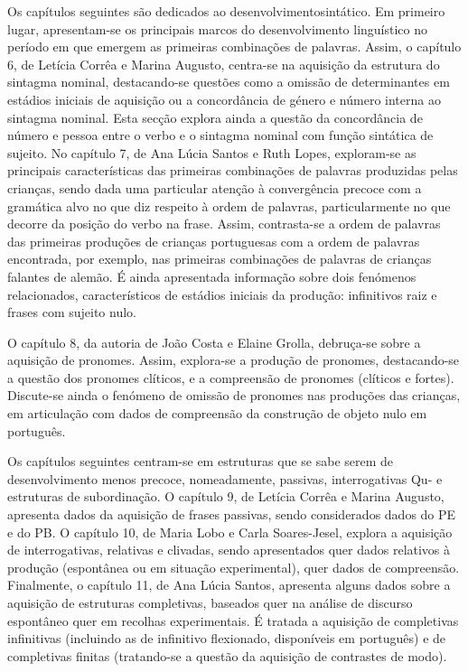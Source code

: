Os capítulos seguintes são dedicados ao desenvolvimento\largerpage sintático. Em primeiro lugar, apresentam-se os principais marcos do desenvolvimento linguístico no período em que emergem as primeiras combinações de palavras. Assim, o capítulo 6, de Letícia Corrêa e Marina Augusto, centra-se na aquisição da estrutura do sintagma nominal, destacando-se questões como a omissão de determinantes em estádios iniciais de aquisição ou a concordância de género e número interna ao sintagma nominal. Esta secção explora ainda a questão da concordância de número e pessoa entre o verbo e o sintagma nominal com função sintática de sujeito. No capítulo 7, de Ana Lúcia Santos e Ruth Lopes, exploram-se as principais características das primeiras combinações de palavras produzidas pelas crianças, sendo dada uma particular atenção à convergência precoce com a gramática alvo no que diz respeito à ordem de palavras, particularmente no que decorre da posição do verbo na frase. Assim, contrasta-se a ordem de palavras das primeiras produções de crianças portuguesas com a ordem de palavras encontrada, por exemplo, nas primeiras combinações de palavras de crianças falantes de alemão. É ainda apresentada informação sobre dois fenómenos relacionados, característicos de estádios iniciais da produção: infinitivos raiz e frases com sujeito nulo.

O capítulo 8, da autoria de João Costa e Elaine Grolla, debruça-se sobre a aquisição de pronomes. Assim, explora-se a produção de pronomes, destacando-se a questão dos pronomes clíticos, e a compreensão de pronomes (clíticos e fortes). Discute-se ainda o fenómeno de omissão de pronomes nas produções das crianças, em articulação com dados de compreensão da construção de objeto nulo em português.

Os capítulos seguintes centram-se em estruturas que se sabe serem de desenvolvimento menos precoce, nomeadamente, passivas, interrogativas Qu- e estruturas de subordinação. O capítulo 9, de Letícia Corrêa e Marina Augusto, apresenta dados da aquisição de frases passivas, sendo considerados dados do PE e do PB. O capítulo 10, de Maria Lobo e Carla Soares-Jesel, explora a aquisição de interrogativas, relativas e clivadas, sendo apresentados quer dados relativos à produção (espontânea ou em situação experimental), quer dados de compreensão. Finalmente, o capítulo 11, de Ana Lúcia Santos, apresenta alguns dados sobre a aquisição de estruturas completivas, baseados quer na análise de discurso espontâneo quer em recolhas experimentais. É tratada a aquisição de completivas infinitivas (incluindo as de infinitivo flexionado, disponíveis em português) e de completivas finitas (tratando-se a questão da aquisição de contrastes de modo). 

